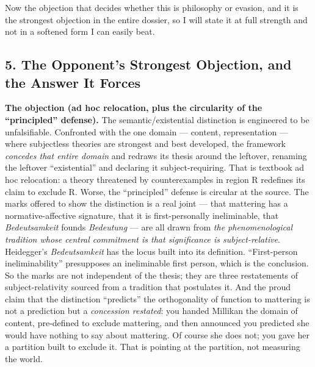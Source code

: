 \documentclass[11pt]{article}
\begin{document}
Now the objection that decides whether this is philosophy or evasion, and it is the strongest objection in the entire dossier, so I will state it at full strength and not in a softened form I can easily beat.

\subsection*{5. The Opponent's Strongest Objection, and the Answer It Forces}

\textbf{The objection (ad hoc relocation, plus the circularity of the ``principled'' defense).} The semantic/\allowbreak{}existential distinction is engineered to be unfalsifiable. Confronted with the one domain — content, representation — where subjectless theories are strongest and best developed, the framework \emph{concedes that entire domain} and redraws its thesis around the leftover, renaming the leftover ``existential'' and declaring it subject-requiring. That is textbook ad hoc relocation: a theory threatened by counterexamples in region R redefines its claim to exclude R. Worse, the ``principled'' defense is circular at the source. The marks offered to show the distinction is a real joint — that mattering has a normative-affective signature, that it is first-personally ineliminable, that \emph{Bedeutsamkeit} founds \emph{Bedeutung} — are all drawn from \emph{the phenomenological tradition whose central commitment is that significance is subject-relative}. Heidegger's \emph{Bedeutsamkeit} has the locus built into its definition. ``First-person ineliminability'' presupposes an ineliminable first person, which is the conclusion. So the marks are not independent of the thesis; they are three restatements of subject-relativity sourced from a tradition that postulates it. And the proud claim that the distinction ``predicts'' the orthogonality of function to mattering is not a prediction but a \emph{concession restated}: you handed Millikan the domain of content, pre-defined to exclude mattering, and then announced you predicted she would have nothing to say about mattering. Of course she does not; you gave her a partition built to exclude it. That is pointing at the partition, not measuring the world.
\end{document}
